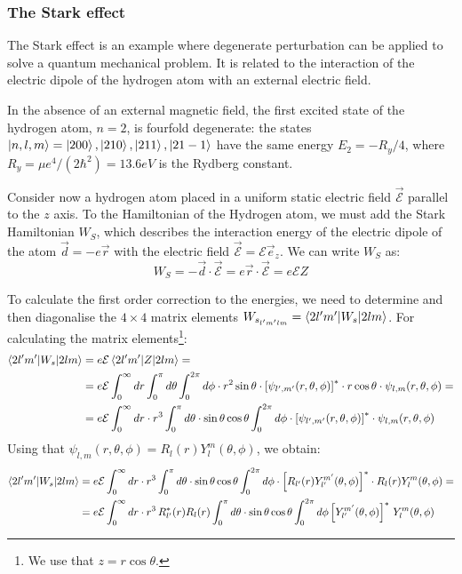 \subsubsection{The Stark effect}

The Stark effect is an example where degenerate perturbation can be applied to solve a quantum mechanical problem. It is related to the interaction of the electric dipole of the hydrogen atom with an external electric field.

In the absence of an external magnetic field, the first excited state of the hydrogen atom, $n=2$, is fourfold degenerate: the states $\ket{n,l,m} = \ket{200}, \ket{210}, \ket{211}, \ket{21-1}$ have the same energy $E_2 = -R_y/4$, where $R_y = \mu e^4 / (2\hbar^2) = 13.6 eV$ is the Rydberg constant. 

Consider now a hydrogen atom placed in a uniform static electric field $\vec{\mathcal{E}}$ parallel to the $z$ axis. To the Hamiltonian of the Hydrogen atom, we must add the Stark Hamiltonian $W_S$, which describes the interaction energy of the electric dipole of the atom $\vec{d} = -e\vec{r}$ with the electric field $\vec{\mathcal{E}} = \mathcal{E}\vec{e}_z$. We can write $W_S$ as:
\begin{equation}
    W_S = -\vec{d}\cdot \vec{\mathcal{E}} = e\vec{r}\cdot \vec{\mathcal{E}} = e\mathcal{E}Z
\end{equation}

To calculate the first order correction to the energies, we need to determine and then diagonalise the $4\times 4$ matrix elements $W_{s_{l'm'lm}} = \braket{2l'm'|W_s|2lm}$. For calculating the matrix elements\footnote{We use that $z = r\cos\theta$.}: 
\begin{equation}
    \begin{split}
        \braket{2l'm'|W_s|2lm} &= e\mathcal{E} \braket{2l'm'|Z|2lm} = \\
        &= e\mathcal{E} \int_{0}^{\infty}dr\int_{0}^{\pi}d\theta\int_{0}^{2\pi}d\phi \cdot r^2\sin\theta \cdot \left[\psi_{l',m'}(r,\theta,\phi)\right]^*\cdot r\cos\theta \cdot\psi_{l,m}(r,\theta,\phi) = \\
        &= e\mathcal{E} \int_{0}^{\infty}dr\cdot r^3\int_{0}^{\pi}d\theta\cdot \sin\theta\cos\theta\int_{0}^{2\pi}d\phi \cdot \left[\psi_{l',m'}(r,\theta,\phi)\right]^*\cdot \psi_{l,m}(r,\theta,\phi)
    \end{split}
\end{equation}
Using that $\psi_{l,m}(r,\theta,\phi) = R_l(r)Y_l^m(\theta, \phi)$, we obtain:
\begin{equation}
    \begin{split}
        \braket{2l'm'|W_s|2lm} &= e\mathcal{E} \int_{0}^{\infty}dr\cdot r^3\int_{0}^{\pi}d\theta\cdot \sin\theta\cos\theta\int_{0}^{2\pi}d\phi \cdot \left[R_{l'}(r)Y_{l'}^{m'}(\theta, \phi)\right]^*\cdot R_l(r)Y_l^m(\theta, \phi) = \\
        &= e\mathcal{E} \int_{0}^{\infty}dr\cdot r^3\, R_{l'}^*(r)R_l(r)\int_{0}^{\pi}d\theta\cdot \sin\theta\cos\theta\int_{0}^{2\pi}d\phi \left[Y_{l'}^{m'}(\theta, \phi)\right]^*\, Y_l^m(\theta, \phi) \\
    \end{split}
\end{equation}

